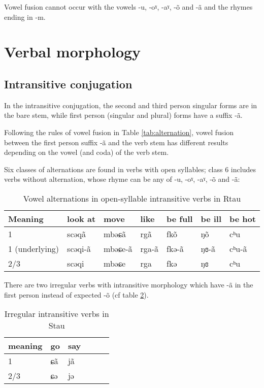 \documentclass[oneside,a4paper,11pt]{article}
\newcommand{\ipa}[1]{{\phon#1}} %
\begin{document}
Vowel fusion cannot occur with the vowels -\ipa{u}, -\ipa{oˠ}, -\ipa{aˠ}, -\ipa{õ} and -\ipa{ã} and the rhymes ending in \ipa{-m}.
 
\section{Verbal morphology}


\subsection{Intransitive conjugation}
In the intransitive conjugation, the second and third person singular forms are in the bare stem, while first person (singular and plural) forms have a suffix \ipa{-ã}.

Following the rules of  vowel fusion in Table \ref{tab:alternation}, vowel fusion between the first person suffix \ipa{-ã} and the verb stem has different results depending on the vowel (and coda) of the verb stem. 
 
Six classes of alternations are found in verbs with open syllables; class 6 includes verbs without alternation, whose rhyme can be any of -\ipa{u}, -\ipa{oˠ}, -\ipa{aˠ}, -\ipa{õ} and -\ipa{ã}:
\begin{table}[H]
\caption{Vowel alternations in open-syllable intransitive verbs in Rtau} \label{tab:open.intr} \centering
\begin{tabular}{llll|ll|l}
\toprule
Meaning &	look at   &  	move   &  	like&  	be full     &  	 	be ill      &  	be hot       \\  
\midrule
1&	\ipa{scəqã} & 	\ipa{mbəɕã} & \ipa{rgã} &	\ipa{fkõ} & 	  	\ipa{ŋõ} & 	   	\ipa{cʰu}   \\ 
1 (underlying)&	\ipa{scəqi-ã} & 	\ipa{mbəɕe-ã} & \ipa{rga-ã} &	\ipa{fkə-ã} & 	  	\ipa{ŋɞ-ã} & 	   	\ipa{cʰu-ã}   \\ 
2/3&	\ipa{scəqi} & 	\ipa{mbəɕe} & \ipa{rga} & 	\ipa{fkə} & 	  	\ipa{ŋɞ} & 	 	\ipa{cʰu}  \\ 
\bottomrule
\end{tabular}
\end{table}


There are two irregular verbs with intransitive morphology  which have \ipa{-ã} in the first person instead of expected \ipa{-õ} (cf table \ref{tab:irr.intr}). 

\begin{table}[H]
\caption{Irregular intransitive verbs in Stau} \label{tab:irr.intr} \centering
\begin{tabular}{llllll}
\toprule
meaning &	go     & say &\\  
\midrule
1&	\ipa{ɕã}  	 &\ipa{jã} &\\ 
2/3&	\ipa{ɕə} & 	\ipa{jə} &\\ 
\bottomrule
\end{tabular}
\end{table}
\end{document}
